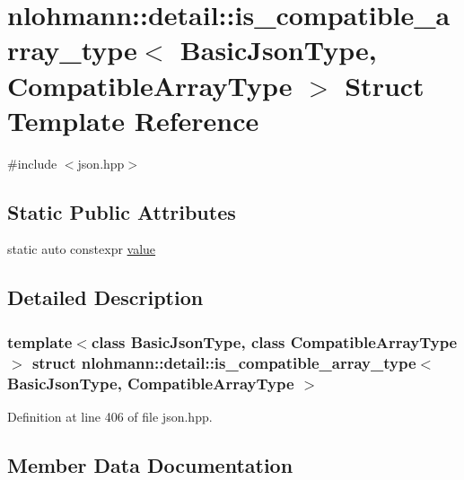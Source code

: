 \hypertarget{structnlohmann_1_1detail_1_1is__compatible__array__type}{}\section{nlohmann\+:\+:detail\+:\+:is\+\_\+compatible\+\_\+array\+\_\+type$<$ Basic\+Json\+Type, Compatible\+Array\+Type $>$ Struct Template Reference}
\label{structnlohmann_1_1detail_1_1is__compatible__array__type}


{\ttfamily \#include $<$json.\+hpp$>$}

\subsection*{Static Public Attributes}
\begin{DoxyCompactItemize}
\item 
static auto constexpr \hyperlink{structnlohmann_1_1detail_1_1is__compatible__array__type_a01bc2274c22746bbb2cefd2acee8b572}{value}
\end{DoxyCompactItemize}


\subsection{Detailed Description}
\subsubsection*{template$<$class Basic\+Json\+Type, class Compatible\+Array\+Type$>$\newline
struct nlohmann\+::detail\+::is\+\_\+compatible\+\_\+array\+\_\+type$<$ Basic\+Json\+Type, Compatible\+Array\+Type $>$}



Definition at line 406 of file json.\+hpp.



\subsection{Member Data Documentation}
\mbox{\label{structnlohmann_1_1detail_1_1is__compatible__array__type_a01bc2274c22746bbb2cefd2acee8b572}} 

